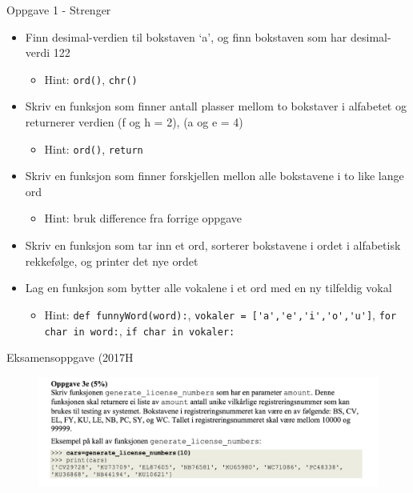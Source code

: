 \documentclass[screen, aspectratio=169]{beamer}
\begin{document}
\begin{frame}[fragile]{Oppgave 1 - Strenger}
	\begin{itemize}
		\item<+-> Finn desimal-verdien til bokstaven ‘a’, og finn bokstaven som har desimal-verdi 122
		\begin{itemize}
		    \item Hint: \lstinline|ord()|, \lstinline|chr()|
		\end{itemize}
		\item<+-> Skriv en funksjon som finner antall plasser mellom to bokstaver i alfabetet og returnerer verdien (f og h = 2), (a og e = 4)
        	\begin{itemize}
		    \item Hint: \lstinline|ord()|, \lstinline|return|
		\end{itemize}
		\item<+-> Skriv en funksjon som finner forskjellen mellon alle bokstavene i to like lange ord
        	\begin{itemize}
		    \item Hint: bruk difference fra forrige oppgave
		\end{itemize}
		\item<+-> Skriv en funksjon som tar inn et ord, sorterer bokstavene i ordet i alfabetisk rekkefølge, og printer det nye ordet

		\item<+-> Lag en funksjon som bytter alle vokalene i et ord med en ny tilfeldig vokal
			\begin{itemize}
		    \item Hint: 	\lstinline|def funnyWord(word):|, \lstinline|vokaler = ['a','e','i','o','u']|,
	\lstinline|for char in word:|, \lstinline|if char in vokaler:|

		\end{itemize}

	\end{itemize}
\end{frame}

\begin{frame}{Eksamensoppgave (2017H}
    \begin{figure}
        \centering
        \includegraphics[width=\textwidth]{fig/streng_2017.png}
        \label{fig:my_label}
    \end{figure}
    
\end{frame}
\end{document}
